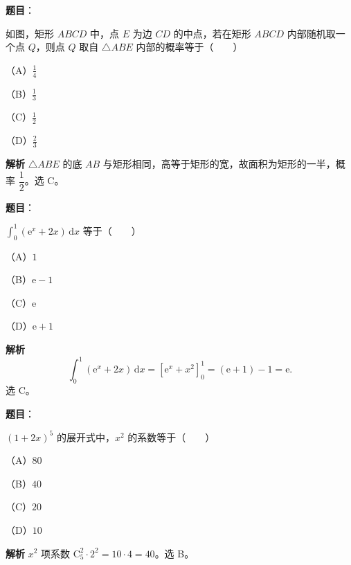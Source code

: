 \begin{answer}

\textbf{题目}：

如图，矩形 $ABCD$ 中，点 $E$ 为边 $CD$ 的中点，若在矩形 $ABCD$ 内部随机取一个点 $Q$，则点 $Q$ 取自 $\triangle ABE$ 内部的概率等于\mbox{（　　）}

（A）$\frac14$

（B）$\frac13$

（C）$\frac12$

（D）$\frac23$
\nopagebreak[4]
\begin{center}\end{center}
\nopagebreak[4]
\textbf{解析}
$\triangle ABE$ 的底 $AB$ 与矩形相同，高等于矩形的宽，故面积为矩形的一半，概率 $\dfrac12$。选 C。


\end{answer}
\begin{answer}

\textbf{题目}：

$\displaystyle\int_0^1(\mathrm e^x+2x)\,\mathrm dx$ 等于\mbox{（　　）}

（A）$1$

（B）$\mathrm e-1$

（C）$\mathrm e$

（D）$\mathrm e+1$

\textbf{解析}
\nopagebreak[4]
\[\int_0^1(\mathrm e^x+2x)\,\mathrm dx=\left[\mathrm e^x+x^2\right]_0^1=(\mathrm e+1)-1=\mathrm e.\]
选 C。


\end{answer}
\begin{answer}

\textbf{题目}：

$(1+2x)^5$ 的展开式中，$x^2$ 的系数等于\mbox{（　　）}

（A）$80$

（B）$40$

（C）$20$

（D）$10$

\textbf{解析}
$x^2$ 项系数 $\mathrm C_5^2\cdot2^2=10\cdot4=40$。选 B。


\end{answer}
